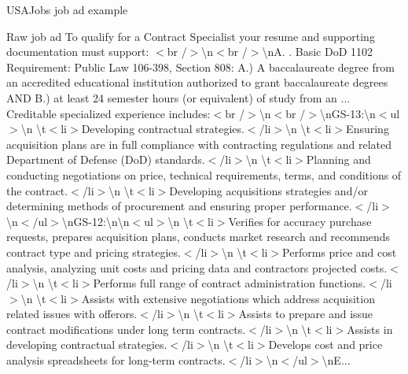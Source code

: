 \documentclass{beamer}
\begin{document}
\begin{frame}{USAJobs job ad example}
  \scriptsize
  \begin{exampleblock}{Raw job ad}
    To qualify for a Contract Specialist your resume and supporting documentation must support: $<$br /$>$\textbackslash n$<$br /$>$\textbackslash nA. . Basic DoD 1102 Requirement: Public Law 106-398, Section 808: A.) A baccalaureate degree from an accredited educational institution authorized to grant baccalaureate degrees AND B.) at least 24 semester hours (or equivalent) of study from an ... Creditable specialized experience includes:$<$br /$>$\textbackslash n$<$br /$>$\textbackslash nGS-13:\textbackslash n$<$ul$>$\textbackslash n \textbackslash t$<$li$>$Developing contractual strategies.$<$/li$>$\textbackslash n \textbackslash t$<$li$>$Ensuring acquisition plans are in full compliance with contracting regulations and related Department of Defense (DoD) standards.$<$/li$>$\textbackslash n \textbackslash t$<$li$>$Planning and conducting negotiations on price, technical requirements, terms, and conditions of the contract.$<$/li$>$\textbackslash n \textbackslash t$<$li$>$Developing acquisitions strategies and/or determining methods of procurement and ensuring proper performance.$<$/li$>$\textbackslash n$<$/ul$>$\textbackslash nGS-12:\textbackslash n\textbackslash n$<$ul$>$\textbackslash n \textbackslash t$<$li$>$Verifies for accuracy purchase requests, prepares acquisition plans, conducts market research and recommends contract type and pricing strategies.$<$/li$>$\textbackslash n \textbackslash t$<$li$>$Performs price and cost analysis, analyzing unit costs and pricing data and contractors projected costs.$<$/li$>$\textbackslash n \textbackslash t$<$li$>$Performs full range of contract administration functions.$<$/li$>$\textbackslash n \textbackslash t$<$li$>$Assists with extensive negotiations which address acquisition related issues with offerors.$<$/li$>$\textbackslash n \textbackslash t$<$li$>$Assists to prepare and issue contract modifications under long term contracts.$<$/li$>$\textbackslash n \textbackslash t$<$li$>$Assists in developing contractual strategies.$<$/li$>$\textbackslash n \textbackslash t$<$li$>$Develops cost and price analysis spreadsheets for long-term contracts.$<$/li$>$\textbackslash n$<$/ul$>$\textbackslash nE...      
  \end{exampleblock}
\end{frame}
\end{document}
